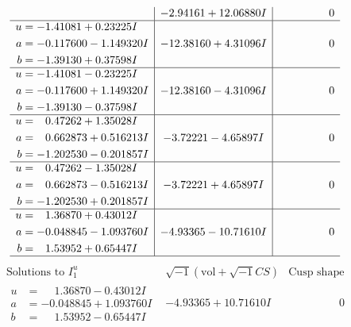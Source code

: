 \documentclass[1p]{elsarticle_modified}
\theoremstyle{definition}
\newcommand{\I}{\sqrt{-1}}
\begin{document}
$$\begin{array}{c|c|c}
 & -2.94161 + 12.06880 I & \phantom{-0.000000 } 0 \\ \hline\begin{aligned}
u &= -1.41081 + 0.23225 I \\
a &= -0.117600 - 1.149320 I \\
b &= -1.39130 + 0.37598 I\end{aligned}
 & -12.38160 + 4.31096 I & \phantom{-0.000000 } 0 \\ \hline\begin{aligned}
u &= -1.41081 - 0.23225 I \\
a &= -0.117600 + 1.149320 I \\
b &= -1.39130 - 0.37598 I\end{aligned}
 & -12.38160 - 4.31096 I & \phantom{-0.000000 } 0 \\ \hline\begin{aligned}
u &= \phantom{-}0.47262 + 1.35028 I \\
a &= \phantom{-}0.662873 + 0.516213 I \\
b &= -1.202530 - 0.201857 I\end{aligned}
 & -3.72221 - 4.65897 I & \phantom{-0.000000 } 0 \\ \hline\begin{aligned}
u &= \phantom{-}0.47262 - 1.35028 I \\
a &= \phantom{-}0.662873 - 0.516213 I \\
b &= -1.202530 + 0.201857 I\end{aligned}
 & -3.72221 + 4.65897 I & \phantom{-0.000000 } 0 \\ \hline\begin{aligned}
u &= \phantom{-}1.36870 + 0.43012 I \\
a &= -0.048845 - 1.093760 I \\
b &= \phantom{-}1.53952 + 0.65447 I\end{aligned}
 & -4.93365 - 10.71610 I & \phantom{-0.000000 } 0\\
 \hline 
 \end{array}$$\newpage$$\begin{array}{c|c|c}  
\text{Solutions to }I^u_{1}& \I (\text{vol} + \sqrt{-1}CS) & \text{Cusp shape}\\
 \hline 
\begin{aligned}
u &= \phantom{-}1.36870 - 0.43012 I \\
a &= -0.048845 + 1.093760 I \\
b &= \phantom{-}1.53952 - 0.65447 I\end{aligned}
 & -4.93365 + 10.71610 I & \phantom{-0.000000 } 0 \\ \hline\begin{aligned}

\end{aligned}
\end{array}$$
\end{document}
